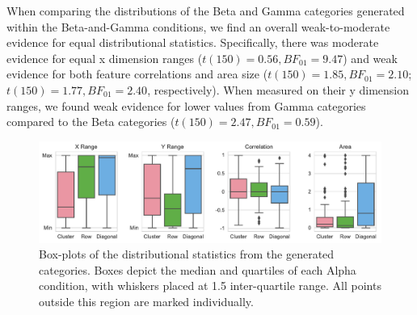 \documentclass[10pt,letterpaper]{article}
\begin{document}
When comparing the distributions of the Beta and Gamma categories generated within the Beta-and-Gamma conditions, we find an overall weak-to-moderate evidence for equal distributional statistics. Specifically, there was moderate evidence for equal x dimension ranges ($t(150) = 0.56, BF_{01} = 9.47$) and weak evidence for both feature correlations and area size ($t(150) = 1.85, BF_{01} = 2.10$;$t(150) = 1.77, BF_{01} = 2.40$, respectively). When measured on their y dimension ranges, we found weak evidence for lower values from Gamma categories compared to the Beta categories ($t(150) = 2.47, BF_{01} = 0.59$).


\begin{figure}%
\begin{center}
    \includegraphics[width=\textwidth]{Figures/stats_cond.pdf}
\end{center}
\caption{Box-plots of the distributional statistics from the generated categories. Boxes depict the median and quartiles of each Alpha condition, with whiskers placed at 1.5 inter-quartile range. All points outside this region are marked individually.} 
\label{fig:stats_cond}
\end{figure}
\end{document}
